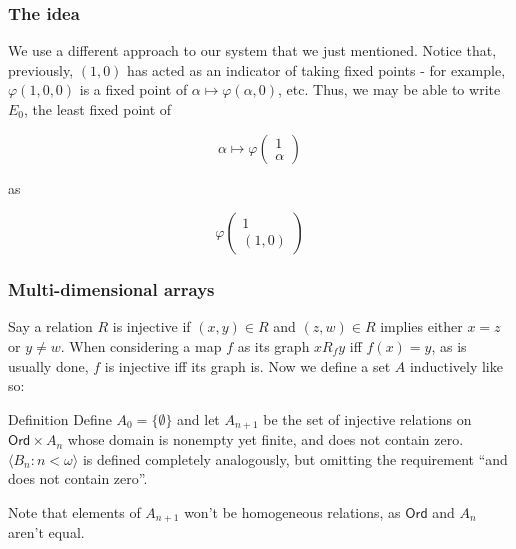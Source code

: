 \documentclass{beamer}
\begin{document}
\begin{frame}
\frametitle{The idea}
We use a different approach to our system that we just mentioned. Notice  that, previously, $(1,0)$ has acted as an indicator of taking fixed points - for example, $\varphi(1,0,0)$ is a fixed point of $\alpha \mapsto \varphi(\alpha,0)$, etc. \pause Thus, we may be able to write $E_0$, the least fixed point of

\begin{equation}
\alpha \mapsto \varphi\left(\begin{matrix} 1 \\ \alpha \end{matrix}\right)
\end{equation}

as 

\begin{equation}
\varphi\left(\begin{matrix} 1 \\ (1,0) \end{matrix}\right)
\end{equation}
\end{frame}

\begin{frame}
\frametitle{Multi-dimensional arrays}
Say a relation $R$ is injective if $(x,y) \in R$ and $(z,w) \in R$ implies either $x = z$ or $y \neq w$. When considering a map $f$ as its graph $xR_fy$ iff $f(x) = y$, as is usually done, $f$ is injective iff its graph is. Now we define a set $A$ inductively like so:

\pause

\begin{block}{Definition}
Define $A_0 = \{\emptyset\}$ and let $A_{n+1}$ be the set of injective relations on $\mathsf{Ord} \times A_n$ whose domain is nonempty yet finite, and does not contain zero. \pause $\langle B_n: n < \omega \rangle$ is defined completely analogously, but omitting the requirement ``and does not contain zero''.
\end{block}

\pause

Note that elements of $A_{n+1}$ won't be homogeneous relations, as $\mathsf{Ord}$ and $A_n$ aren't equal.
\end{frame}
\end{document}
